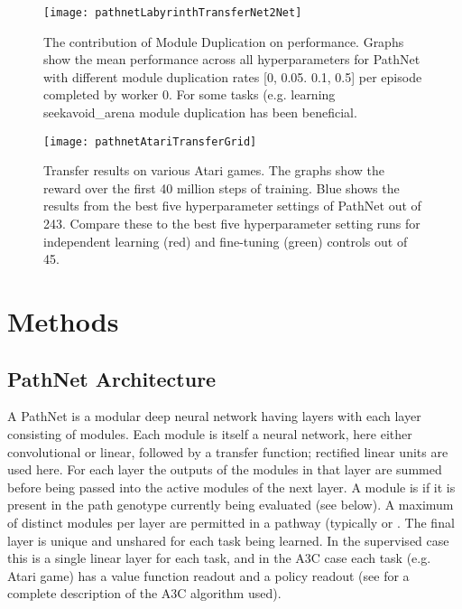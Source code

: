 \documentclass{sig-alternate-05-2015}
\begin{document}
\begin{figure*}[h!]
\centering
\texttt{[image: pathnetLabyrinthTransferNet2Net]}
\caption{The contribution of Module Duplication on performance. Graphs show the mean performance across all hyperparameters for PathNet with different module duplication rates [0, 0.05. 0.1, 0.5] per episode completed by worker 0. For some tasks (e.g. learning seekavoid\_arena module duplication has been beneficial.}
\label{fig:transferNet2Net}
\end{figure*}

\begin{figure*}[h!]
\centering
\texttt{[image: pathnetAtariTransferGrid]}
\caption{Transfer results on various Atari games. The graphs show the reward over the first 40 million steps of training. Blue shows the results from the best five hyperparameter settings of PathNet out of 243. Compare these to the best five hyperparameter setting runs for independent learning (red) and fine-tuning (green) controls out of 45.}
\label{fig:atariGrid}
\end{figure*}

\section{Methods} 

\subsection{PathNet Architecture} 
A PathNet is a modular deep neural network having  layers with each layer consisting of  modules. Each module is itself a neural network, here either convolutional or linear, followed by a transfer function; rectified linear units are used here. For each layer the outputs of the modules in that layer are summed before being passed into the active modules of the next layer. A module is  if it is present in the path genotype currently being evaluated (see below). A maximum of  distinct modules per layer are permitted in a pathway (typically  or . The final layer is unique and unshared for each task being learned. In the supervised case this is a single linear layer for each task, and in the A3C case each task (e.g. Atari game) has a value function readout and a  policy readout (see \cite{mnih2016asynchronous} for a complete description of the A3C algorithm used). \\
\end{document}
